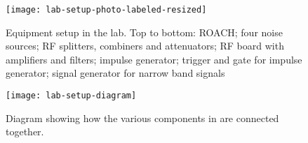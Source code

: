 \begin{figure}
  \centering
  \texttt{[image: lab-setup-photo-labeled-resized]}
  \caption{Equipment setup in the lab. Top to bottom: ROACH; four noise sources; RF splitters, combiners and attenuators; RF board with amplifiers and filters; impulse generator; trigger and gate for impulse generator; signal generator for narrow band signals}
  \label{fig:firmware:lab-setup-photo}
\end{figure}
\begin{figure}
  \centering
  \texttt{[image: lab-setup-diagram]}
  \caption{Diagram showing how the various components in  are connected together.}
  \label{fig:firmware-lab-setup-diagram}
\end{figure}


